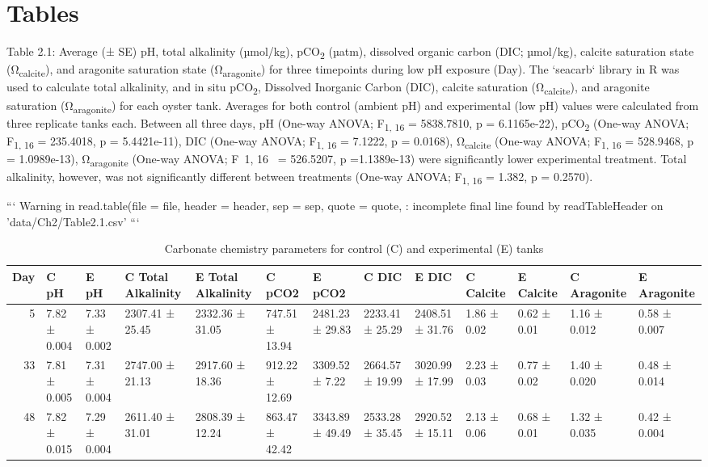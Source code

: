 \documentclass [11pt, proquest] {uwthesis}[2015/03/03]
\begin{document}
\hypertarget{tables-1}{%
\section{Tables}\label{tables-1}}
\begin{landscape}

Table 2.1: Average (± SE) pH, total alkalinity (µmol/kg), pCO\textsubscript{2} (µatm), dissolved organic carbon (DIC; µmol/kg), calcite saturation state (Ω\textsubscript{calcite}), and aragonite saturation state (Ω\textsubscript{aragonite}) for three timepoints during low pH exposure (Day). The `seacarb` library in R was used to calculate total alkalinity, and in situ pCO\textsubscript{2}, Dissolved Inorganic Carbon (DIC), calcite saturation (Ω\textsubscript{calcite}), and aragonite saturation (Ω\textsubscript{aragonite}) for each oyster tank. Averages for both control (ambient pH) and experimental (low pH) values were calculated from three replicate tanks each. Between all three days, pH (One-way ANOVA; F\textsubscript{1, 16} = 5838.7810, p = 6.1165e-22), pCO\textsubscript{2} (One-way ANOVA; F\textsubscript{1, 16} = 235.4018, p = 5.4421e-11), DIC (One-way ANOVA; F\textsubscript{1, 16} = 7.1222, p = 0.0168), Ω\textsubscript{calcite} (One-way ANOVA; F\textsubscript{1, 16} = 528.9468, p = 1.0989e-13), Ω\textsubscript{aragonite} (One-way ANOVA; F~1, 16~ = 526.5207, p =1.1389e-13) were significantly lower experimental treatment. Total alkalinity, however, was not significantly different between treatments (One-way ANOVA; F\textsubscript{1, 16} = 1.382, p = 0.2570).


```
Warning in read.table(file = file, header = header, sep = sep, quote = quote, :
incomplete final line found by readTableHeader on 'data/Ch2/Table2.1.csv'
```

\begingroup\fontsize{5}{7}\selectfont
\begin{longtable}[t]{rllllllllllll}
\caption{\label{tab:carbchem}Carbonate chemistry parameters for control (C) and experimental (E) tanks}\\
\toprule
Day & C pH & E pH & C Total Alkalinity & E Total Alkalinity & C pCO2 & E pCO2 & C  DIC & E DIC & C Calcite & E Calcite & C Aragonite & E Aragonite\\
\midrule
5 & 7.82 ± 0.004 & 7.33 ± 0.002 & 2307.41 ± 25.45 & 2332.36 ± 31.05 & 747.51 ± 13.94 & 2481.23 ± 29.83 & 2233.41 ± 25.29 & 2408.51 ± 31.76 & 1.86 ± 0.02 & 0.62 ± 0.01 & 1.16 ± 0.012  & 0.58 ± 0.007\\
33 & 7.81 ± 0.005 & 7.31 ± 0.004 & 2747.00 ± 21.13 & 2917.60 ± 18.36 & 912.22 ± 12.69 & 3309.52 ± 7.22 & 2664.57 ± 19.99 & 3020.99 ± 17.99 & 2.23 ± 0.03 & 0.77 ± 0.02 & 1.40 ± 0.020 & 0.48 ± 0.014\\
48 & 7.82 ± 0.015 & 7.29 ± 0.004 & 2611.40 ± 31.01 & 2808.39 ± 12.24 & 863.47 ± 42.42 & 3343.89 ± 49.49 & 2533.28 ± 35.45 & 2920.52 ± 15.11 & 2.13 ± 0.06 & 0.68 ± 0.01 & 1.32 ± 0.035 & 0.42 ± 0.004\\
\bottomrule
\end{longtable}
\endgroup{}

\end{landscape}
\clearpage
\end{document}
